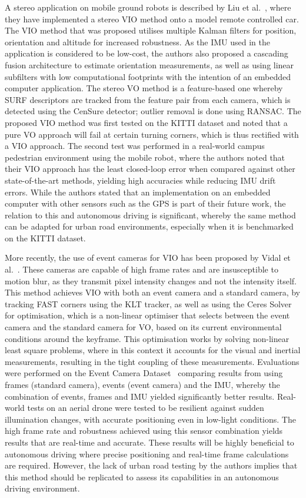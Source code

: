 A stereo application on mobile ground robots is described by Liu et al.~\cite{liu_stereo_2016}, where they have implemented a stereo VIO method onto a model remote controlled car. The VIO method that was proposed utilises multiple Kalman filters for position, orientation and altitude for increased robustness. As the IMU used in the application is considered to be low-cost, the authors also proposed a cascading fusion architecture to estimate orientation measurements, as well as using linear subfilters with low computational footprints with the intention of an embedded computer application. The stereo VO method is a feature-based one whereby SURF descriptors are tracked from the feature pair from each camera, which is detected using the CenSure detector; outlier removal is done using RANSAC. The proposed VIO method was first tested on the KITTI dataset and noted that a pure VO approach will fail at certain turning corners, which is thus rectified with a VIO approach. The second test was performed in a real-world campus pedestrian environment using the mobile robot, where the authors noted that their VIO approach has the least closed-loop error when compared against other state-of-the-art methods, yielding high accuracies while reducing IMU drift errors. While the authors stated that an implementation on an embedded computer with other sensors such as the GPS is part of their future work, the relation to this and autonomous driving is significant, whereby the same method can be adapted for urban road environments, especially when it is benchmarked on the KITTI dataset.

More recently, the use of event cameras for VIO has been proposed by Vidal et al.~\cite{vidal_ultimate_2018}. These cameras are capable of high frame rates and are insusceptible to motion blur, as they transmit pixel intensity changes and not the intensity itself. This method achieves VIO with both an event camera and a standard camera, by tracking FAST corners using the KLT tracker, as well as using the Ceres Solver~\cite{agarwal_ceres_nodate} for optimisation, which is a non-linear optimiser that selects between the event camera and the standard camera for VO, based on its current environmental conditions around the keyframe. This optimisation works by solving non-linear least square problems, where in this context it accounts for the visual and inertial measurements, resulting in the tight coupling of these measurements. Evaluations were performed on the Event Camera Dataset~\cite{mueggler_event-camera_2017} comparing results from using frames (standard camera), events (event camera) and the IMU, whereby the combination of events, frames and IMU yielded significantly better results. Real-world tests on an aerial drone were tested to be resilient against sudden illumination changes, with accurate positioning even in low-light conditions. The high frame rate and robustness achieved using this sensor combination yields results that are real-time and accurate. These results will be highly beneficial to autonomous driving where precise positioning and real-time frame calculations are required. However, the lack of urban road testing by the authors implies that this method should be replicated to assess its capabilities in an autonomous driving environment. 

